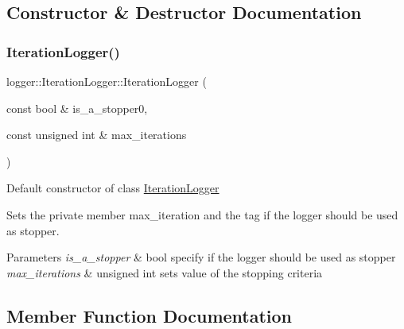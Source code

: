 \subsection{Constructor \& Destructor Documentation}
\mbox{\label{classlogger_1_1_iteration_logger_a571269a473e45ed773685092fab123c6}} 
\subsubsection{\texorpdfstring{Iteration\+Logger()}{IterationLogger()}}
{\footnotesize\ttfamily logger\+::\+Iteration\+Logger\+::\+Iteration\+Logger (\begin{DoxyParamCaption}\item[{const bool \&}]{is\+\_\+a\+\_\+stopper0,  }\item[{const unsigned int \&}]{max\+\_\+iterations }\end{DoxyParamCaption})}



Default constructor of class {\ttfamily \mbox{\hyperlink{classlogger_1_1_iteration_logger}{Iteration\+Logger}}} 

Sets the private member {\ttfamily max\+\_\+iteration} and the tag if the logger should be used as stopper.


\begin{DoxyParams}{Parameters}
{\em is\+\_\+a\+\_\+stopper} & {\ttfamily bool} specify if the logger should be used as stopper \\
\hline
{\em max\+\_\+iterations} & {\ttfamily unsigned int} sets value of the stopping criteria \\
\hline
\end{DoxyParams}


\subsection{Member Function Documentation}
\mbox{\label{classlogger_1_1_iteration_logger_a7439c16a1482ad8c09f8ab37baf45690}} 
